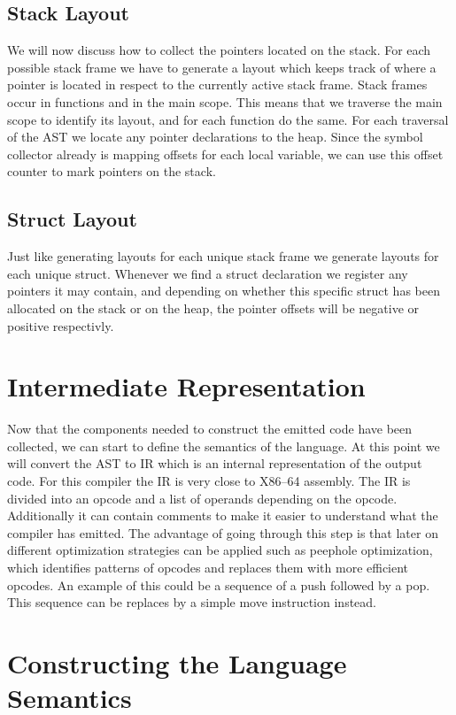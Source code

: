 \subsection{Stack Layout}
We will now discuss how to collect the pointers located on the stack. For each possible stack frame we have to generate a layout which keeps track of where a pointer is located in respect to the currently active stack frame. Stack frames occur in functions and in the main scope. This means that we traverse the main scope to identify its layout, and for each function do the same. For each traversal of the AST we locate any pointer declarations to the heap. Since the symbol collector already is mapping offsets for each local variable, we can use this offset counter to mark pointers on the stack. 

\subsection{Struct Layout}

Just like generating layouts for each unique stack frame we generate layouts for each unique struct. Whenever we find a struct declaration we register any pointers it may contain, and depending on whether this specific struct has been allocated on the stack or on the heap, the pointer offsets will be negative or positive respectivly. 

\section{Intermediate Representation}

Now that the components needed to construct the emitted code have been collected, we can start to define the semantics of the language. At this point we will convert the AST to IR which is an internal representation of the output code. For this compiler the IR is very close to X86--64 assembly. The IR is divided into an opcode and a list of operands depending on the opcode. Additionally it can contain comments to make it easier to understand what the compiler has emitted. The advantage of going through this step is that later on different optimization strategies can be applied such as peephole optimization, which identifies patterns of opcodes and replaces them with more efficient opcodes. An example of this could be a sequence of a push followed by a pop. This sequence can be replaces by a simple move instruction instead.  

\section{Constructing the Language Semantics}

